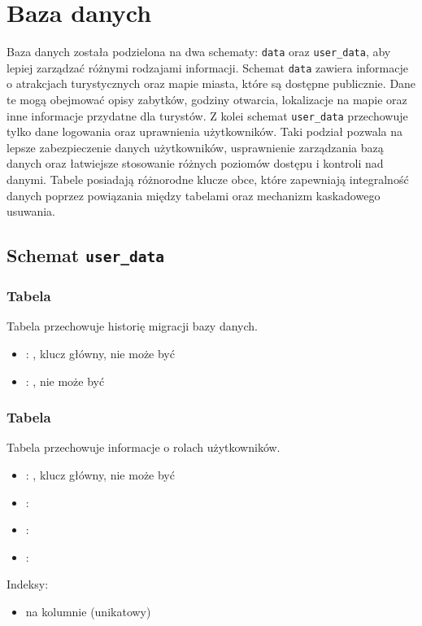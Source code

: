 \section{Baza danych}
Baza danych została podzielona na dwa schematy: \texttt{data} oraz \texttt{user\_data}, aby lepiej zarządzać różnymi rodzajami informacji.
Schemat \texttt{data} zawiera informacje o atrakcjach turystycznych oraz mapie miasta, które są dostępne publicznie.
Dane te mogą obejmować opisy zabytków, godziny otwarcia, lokalizacje na mapie oraz inne informacje przydatne dla turystów.
Z kolei schemat \texttt{user\_data} przechowuje tylko dane logowania oraz uprawnienia użytkowników.
Taki podział pozwala na lepsze zabezpieczenie danych użytkowników, usprawnienie zarządzania bazą danych oraz łatwiejsze stosowanie różnych poziomów dostępu i kontroli nad danymi.
Tabele posiadają różnorodne klucze obce, które zapewniają integralność danych poprzez powiązania między tabelami oraz mechanizm kaskadowego usuwania.

\subsection{Schemat \texttt{user\_data}}

\subsubsection{Tabela }
Tabela przechowuje historię migracji bazy danych.
\begin{itemize}
    \item {}: , klucz główny, nie może być 
    \item {}: , nie może być 
\end{itemize}

\subsubsection{Tabela }
Tabela przechowuje informacje o rolach użytkowników.
\begin{itemize}
    \item {}: , klucz główny, nie może być 
    \item {}: 
    \item {}: 
    \item {}: 
\end{itemize}
Indeksy:
\begin{itemize}
    \item {} na kolumnie  (unikatowy)
\end{itemize}

